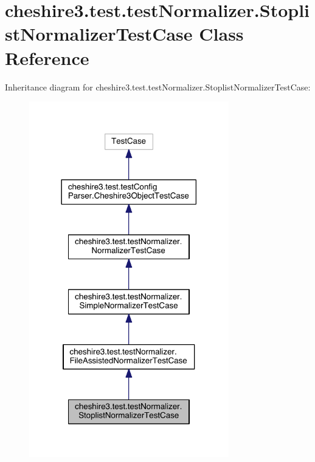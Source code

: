 \hypertarget{classcheshire3_1_1test_1_1test_normalizer_1_1_stoplist_normalizer_test_case}{\section{cheshire3.\-test.\-test\-Normalizer.\-Stoplist\-Normalizer\-Test\-Case Class Reference}
\label{classcheshire3_1_1test_1_1test_normalizer_1_1_stoplist_normalizer_test_case}
}


Inheritance diagram for cheshire3.\-test.\-test\-Normalizer.\-Stoplist\-Normalizer\-Test\-Case\-:
\nopagebreak
\begin{figure}[H]
\begin{center}
\leavevmode
\includegraphics[width=246pt]{classcheshire3_1_1test_1_1test_normalizer_1_1_stoplist_normalizer_test_case__inherit__graph}
\end{center}
\end{figure}


